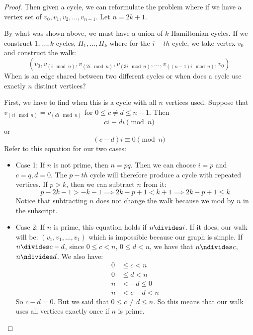 \documentclass{article}
\begin{document}
\begin{proof}
        Then given a cycle, we can reformulate the problem where if we have a vertex set of $v_{0}, v_{1}, v_{2}, \ldots, v_{n - 1}$. Let $n = 2k + 1$.

        By what was shown above, we must have a union of $k$ Hamiltonian cycles. If we construct $1, \ldots, k$ cycles, $H_{1}, \ldots, H_{k}$ where for the $i-th$ cycle, we take vertex $v_{0}$ and construct the walk: 
            \begin{equation*}
                (v_{0}, v_{(i \mod{n})}, v_{(2i\mod{n})}, v_{(3i\mod{n})}, \ldots, v_{((n - 1)i\mod{n})}, v_{0})
            \end{equation*}
        When is an edge shared between two different cycles or when does a cycle use exactly $n$ distinct vertices?

        First, we have to find when this is a cycle with all $n$ vertices used. Suppose that $v_{(ci \mod{n})} = v_{(di \mod{n})}$ for $0 \leq c \neq d \leq n - 1$. Then
            \begin{equation*}
                ci \equiv di \pmod{n}
            \end{equation*}
        or
            \begin{equation*}
                (c - d)i \equiv 0 \pmod{n}
            \end{equation*}
        Refer to this equation for our two cases:
            \begin{itemize}
                \item Case 1: If $n$ is not prime, then $n = pq$. Then we can choose $i = p$ and $c = q, d = 0$. The $p-th$ cycle will therefore produce a cycle with repeated vertices. If $p > k$, then we can subtract $n$ from it:
                    \begin{equation*}
                        p - 2k - 1 > -k - 1 \implies 2k - p + 1 < k + 1 \implies 2k - p + 1 \leq k
                    \end{equation*}
                Notice that subtracting $n$ does not change the walk because we mod by $n$ in the subscript.

                \item  Case 2: If $n$ is prime, this equation holds if $n \divides i$. If it does, our walk will be: $(v_{1}, v_{1}, \ldots, v_{1})$ which is impossible because our graph is simple. If $n \divides c - d$, since $0 \leq c < n$, $0 \leq d < n$, we have that $n \ndivides c$, $n \ndivides d$. We also have:
                    \begin{align*}
                        0  &\leq  c < n     \\
                        0  &\leq d < n      \\
                        n &<    -d \leq 0  \\
                        n &<     c - d < n
                    \end{align*}
                So $c - d = 0$. But we said that $0 \leq c \neq d \leq n$. So this means that our walk uses all vertices exactly once if $n$ is prime.
            \end{itemize}


\end{proof}
\end{document}
